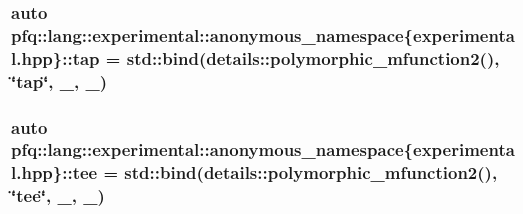 \hypertarget{namespacepfq_1_1lang_1_1experimental_1_1anonymous__namespace_02experimental_8hpp_03_a66641cfa5d43270458e7fbfb626d0e2e}{
\subsubsection[{tap}]{\setlength{\rightskip}{0pt plus 5cm}auto pfq\+::lang\+::experimental\+::anonymous\+\_\+namespace\{experimental.\+hpp\}\+::tap = std\+::bind(details\+::polymorphic\+\_\+mfunction2(), \char`\"{}tap\char`\"{}, \+\_, \+\_)}}\label{namespacepfq_1_1lang_1_1experimental_1_1anonymous__namespace_02experimental_8hpp_03_a66641cfa5d43270458e7fbfb626d0e2e}
\hypertarget{namespacepfq_1_1lang_1_1experimental_1_1anonymous__namespace_02experimental_8hpp_03_a1c49a70b83c2e42067c558a8bfcf8211}{
\subsubsection[{tee}]{\setlength{\rightskip}{0pt plus 5cm}auto pfq\+::lang\+::experimental\+::anonymous\+\_\+namespace\{experimental.\+hpp\}\+::tee = std\+::bind(details\+::polymorphic\+\_\+mfunction2(), \char`\"{}tee\char`\"{}, \+\_, \+\_)}}\label{namespacepfq_1_1lang_1_1experimental_1_1anonymous__namespace_02experimental_8hpp_03_a1c49a70b83c2e42067c558a8bfcf8211}
